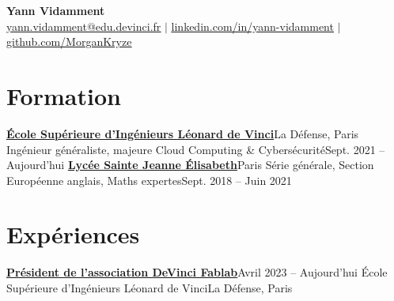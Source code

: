 \documentclass[letterpaper,11pt]{article}
\begin{document}
\begin{center}
  \textbf{\Huge Yann Vidamment} \\ \vspace{1pt}
  \href{mailto:yann.vidamment@edu.devinci.fr}{\underline{yann.vidamment@edu.devinci.fr}} $|$ 
  \href{https://linkedin.com/in/yann-vidamment-80a512254/}{\underline{linkedin.com/in/yann-vidamment}} $|$
  \href{https://github.com/MorganKryze}{\underline{github.com/MorganKryze}}
\end{center}

\section{Formation}
  \resumeSubHeadingListStart
    \resumeSubheading
      {\href{https://www.esilv.fr/}{\textbf{École Supérieure d'Ingénieurs Léonard de Vinci}}}{La Défense, Paris}
      {Ingénieur généraliste, majeure Cloud Computing \& Cybersécurité}{Sept. 2021 -- Aujourd'hui}
    \resumeSubheading
      {\href{https://www.ste-jeanne-elisabeth.com/}{\textbf{Lycée Sainte Jeanne Élisabeth}}}{Paris}
      {Série générale, Section Européenne anglais, Maths expertes}{Sept. 2018 -- Juin 2021}
  \resumeSubHeadingListEnd

\section{Expériences}
  \resumeSubHeadingListStart
    \resumeSubheading
      {\href{https://dvic.devinci.fr/fablab/}{\textbf{Président de l'association DeVinci Fablab}}}{Avril 2023 -- Aujourd'hui}
      {École Supérieure d'Ingénieurs Léonard de Vinci}{La Défense, Paris}
      \resumeItemListStart
      \resumeItemListEnd
\end{document}

